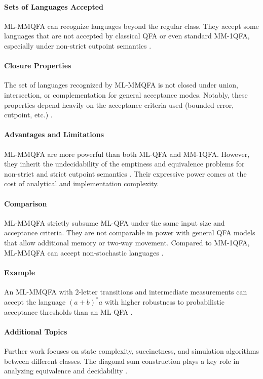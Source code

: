 \paragraph{Sets of Languages Accepted}
ML-MMQFA can recognize languages beyond the regular class. They accept some languages that are not accepted by classical QFA or even standard MM-1QFA, especially under non-strict cutpoint semantics \cite{qiu2009hierarchy, lin2012equivalence}.

\paragraph{Closure Properties}
The set of languages recognized by ML-MMQFA is not closed under union, intersection, or complementation for general acceptance modes. Notably, these properties depend heavily on the acceptance criteria used (bounded-error, cutpoint, etc.) \cite{qiu2009hierarchy}.

\paragraph{Advantages and Limitations}
ML-MMQFA are more powerful than both ML-QFA and MM-1QFA. However, they inherit the undecidability of the emptiness and equivalence problems for non-strict and strict cutpoint semantics \cite{qiu2008decidability, lin2012equivalence}. Their expressive power comes at the cost of analytical and implementation complexity.

\paragraph{Comparison}
ML-MMQFA strictly subsume ML-QFA under the same input size and acceptance criteria. They are not comparable in power with general QFA models that allow additional memory or two-way movement. Compared to MM-1QFA, ML-MMQFA can accept non-stochastic languages \cite{qiu2009hierarchy}.

\paragraph{Example}
An ML-MMQFA with 2-letter transitions and intermediate measurements can accept the language $(a+b)^*a$ with higher robustness to probabilistic acceptance thresholds than an ML-QFA \cite{belovs2007multi}.

\paragraph{Additional Topics}
Further work focuses on state complexity, succinctness, and simulation algorithms between different classes. The diagonal sum construction plays a key role in analyzing equivalence and decidability \cite{lin2012equivalence}.



